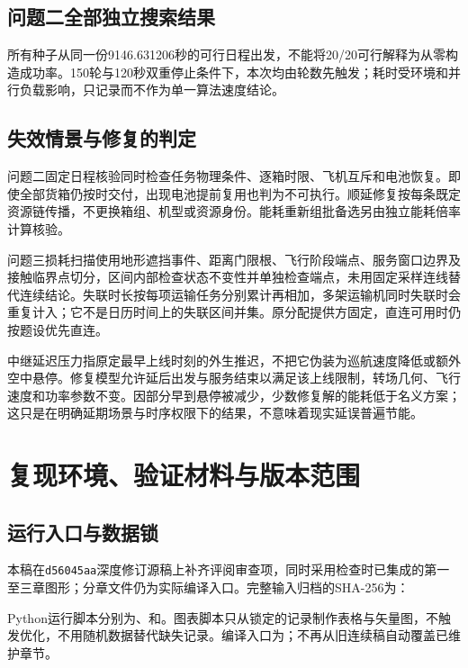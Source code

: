 \subsection{问题二全部独立搜索结果}
所有种子从同一份9146.631206秒的可行日程出发，不能将20/20可行解释为从零构造成功率。150轮与120秒双重停止条件下，本次均由轮数先触发；耗时受环境和并行负载影响，只记录而不作为单一算法速度结论。


\subsection{失效情景与修复的判定}
问题二固定日程核验同时检查任务物理条件、逐箱时限、飞机互斥和电池恢复。即使全部货箱仍按时交付，出现电池提前复用也判为不可执行。顺延修复按每条既定资源链传播，不更换箱组、机型或资源身份。能耗重新组批备选另由独立能耗倍率计算核验。

问题三损耗扫描使用地形遮挡事件、距离门限根、飞行阶段端点、服务窗口边界及接触临界点切分，区间内部检查状态不变性并单独检查端点，未用固定采样连线替代连续结论。失联时长按每项运输任务分别累计再相加，多架运输机同时失联时会重复计入；它不是日历时间上的失联区间并集。原分配提供方固定，直连可用时仍按题设优先直连。

中继延迟压力指原定最早上线时刻的外生推迟，不把它伪装为巡航速度降低或额外空中悬停。修复模型允许延后出发与服务结束以满足该上线限制，转场几何、飞行速度和功率参数不变。因部分早到悬停被减少，少数修复解的能耗低于名义方案；这只是在明确延期场景与时序权限下的结果，不意味着现实延误普遍节能。

\section{复现环境、验证材料与版本范围}
\label{app:reproducibility}
\subsection{运行入口与数据锁}
本稿在\texttt{d56045aa}深度修订源稿上补齐评阅审查项，同时采用检查时已集成的第一至三章图形；分章文件仍为实际编译入口。完整输入归档的SHA-256为：
\begin{description}[leftmargin=0pt,labelindent=0pt]
\item[问题二正式证据包]
\item[问题三完整运行包]
\end{description}
Python运行脚本分别为、和。图表脚本只从锁定的记录制作表格与矢量图，不触发优化，不用随机数据替代缺失记录。编译入口为；不再从旧连续稿自动覆盖已维护章节。


